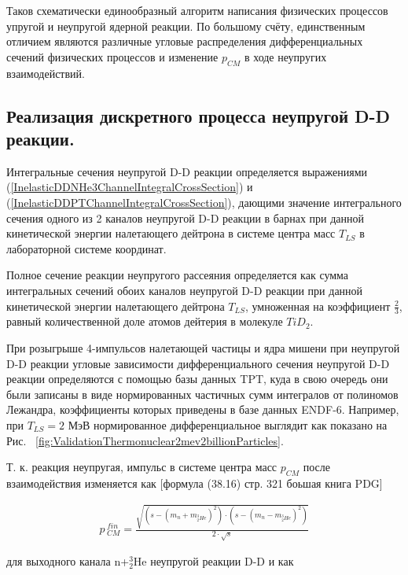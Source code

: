 \documentclass[a4paper,12pt]{article}
\begin{document}
\begin{large}
	Таков схематически единообразный алгоритм написания физических процессов упругой и неупругой ядерной реакции.
	По большому счёту, единственным отличием являются различные угловые распределения дифференциальных сечений физических процессов и изменение $p_{CM}$ в ходе неупругих взаимодействий.
	
\subsection{Реализация дискретного процесса неупругой D-D реакции.}
\label{InelasticDDReactionRealization}

	Интегральные сечения неупругой D-D реакции определяется выражениями (\ref{InelasticDDNHe3ChannelIntegralCrossSection}) и (\ref{InelasticDDPTChannelIntegralCrossSection}), дающими значение интегрального сечения одного из 2 каналов неупругой D-D реакции в барнах при данной кинетической энергии налетающего дейтрона в системе центра масс $T_{LS}$ в лабораторной системе координат.
	
	Полное сечение реакции неупругого рассеяния определяется как сумма интегральных сечений обоих каналов неупругой D-D реакции при данной кинетической энергии налетающего дейтрона $T_{LS}$, умноженная на коэффициент $\frac{2}{3}$, равный количественной доле атомов дейтерия в молекуле $TiD_2$.
	
	При розыгрыше 4-импульсов налетающей частицы и ядра мишени при неупругой D-D реакции угловые зависимости дифференциального сечения неупругой D-D реакции определяются с помощью базы данных TPT, куда в свою очередь они были записаны в виде нормированных частичных сумм интегралов от полиномов Лежандра, коэффициенты которых приведены в базе данных ENDF-6.
	Например, при $T_{LS}=2$ МэВ нормированное дифференциальное выглядит как показано на Рис. ~\ref{fig:ValidationThermonuclear2mev2billionParticles}.
	
	Т. к. реакция неупругая, импульс в системе центра масс $p_{CM}$ после взаимодействия изменяется как [формула (38.16) стр. 321 боьшая книга PDG]
	
\begin{equation}
\label{PCMInelasticDDAfterNHe3}
\begin{aligned} 
  p\,_{CM}^{fin} = \frac{ \sqrt{ \left( s-\left( m_n + m_{^3_2He}\right)^2 \right) \cdot \left( s-\left( m_n - m_{^3_2He} \right)^2 \right) } }{2\cdot \sqrt{s}}
\end{aligned}
\end{equation}

	для выходного канала n+$^3_2$He неупругой реакции D-D и как


\end{large}
\end{document}
